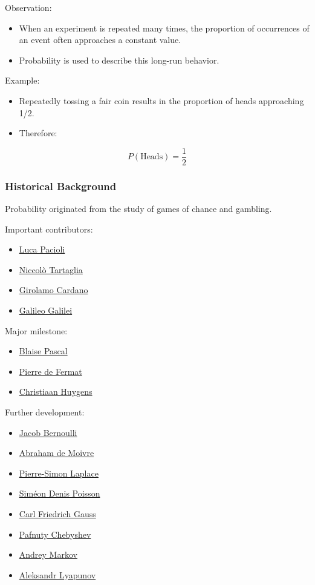 \documentclass[11pt]{article}
\begin{document}
Observation:
\begin{itemize}
\item When an experiment is repeated many times, the proportion of occurrences of an event often approaches a constant value.
\item Probability is used to describe this long-run behavior.
\end{itemize}

Example:
\begin{itemize}
\item Repeatedly tossing a fair coin results in the proportion of heads approaching 1/2.
\item Therefore:
\end{itemize}

\[
P(\text{Heads})=\frac{1}{2}
\]
\subsubsection{Historical Background}
\label{sec:org1388833}

Probability originated from the study of games of chance and gambling.

Important contributors:

\begin{itemize}
\item \href{../../_ocean_/people.org}{Luca Pacioli}
\item \href{../../_ocean_/people.org}{Niccolò Tartaglia}
\item \href{../../_ocean_/people.org}{Girolamo Cardano}
\item \href{../../_ocean_/people.org}{Galileo Galilei}
\end{itemize}

Major milestone:

\begin{itemize}
\item \href{../../_ocean_/people.org}{Blaise Pascal}
\item \href{../../_ocean_/people.org}{Pierre de Fermat}
\item \href{../../_ocean_/people.org}{Christiaan Huygens}
\end{itemize}

Further development:

\begin{itemize}
\item \href{../../_ocean_/people.org}{Jacob Bernoulli}
\item \href{../../_ocean_/people.org}{Abraham de Moivre}
\item \href{../../_ocean_/people.org}{Pierre-Simon Laplace}
\item \href{../../_ocean_/people.org}{Siméon Denis Poisson}
\item \href{../../_ocean_/people.org}{Carl Friedrich Gauss}
\item \href{../../_ocean_/people.org}{Pafnuty Chebyshev}
\item \href{../../_ocean_/people.org}{Andrey Markov}
\item \href{../../_ocean_/people.org}{Aleksandr Lyapunov}
\end{itemize}
\end{document}
